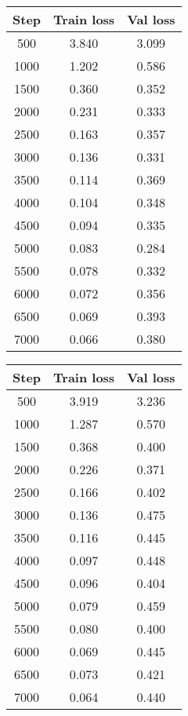 \begin{figure}[h]
    \centering
    \begin{minipage}{.5\textwidth}
        \centering
        \captionsetup{justification=centering} 
        \label{tab:model-checkpoints1}
        \begin{tabular}{ccc}
        \toprule
        \textbf{Step} & \textbf{Train loss} & \textbf{Val loss} \\
        \midrule
        500  & 3.840 & 3.099 \\
        1000 & 1.202 & 0.586 \\
        1500 & 0.360 & 0.352 \\
        2000 & 0.231 & 0.333 \\
        2500 & 0.163 & 0.357 \\
        3000 & 0.136 & 0.331 \\
        3500 & 0.114 & 0.369 \\
        4000 & 0.104 & 0.348 \\
        4500 & 0.094 & 0.335 \\
        5000 & 0.083 & 0.284 \\
        5500 & 0.078 & 0.332 \\
        6000 & 0.072 & 0.356 \\
        6500 & 0.069 & 0.393 \\
        7000 & 0.066 & 0.380 \\
        \bottomrule
        \end{tabular}
    \end{minipage}%
    \begin{minipage}{.5\textwidth}
        \centering
        \label{tab:model-checkpoints2}
        \begin{tabular}{ccc}
        \toprule
        \textbf{Step} & \textbf{Train loss} & \textbf{Val loss} \\
        \midrule
        500  & 3.919 & 3.236 \\
        1000 & 1.287 & 0.570 \\
        1500 & 0.368 & 0.400 \\
        2000 & 0.226 & 0.371 \\
        2500 & 0.166 & 0.402 \\
        3000 & 0.136 & 0.475 \\
        3500 & 0.116 & 0.445 \\
        4000 & 0.097 & 0.448 \\
        4500 & 0.096 & 0.404 \\
        5000 & 0.079 & 0.459 \\
        5500 & 0.080 & 0.400 \\
        6000 & 0.069 & 0.445 \\
        6500 & 0.073 & 0.421 \\
        7000 & 0.064 & 0.440 \\
        \bottomrule
        \end{tabular}
    \end{minipage}
\end{figure}

